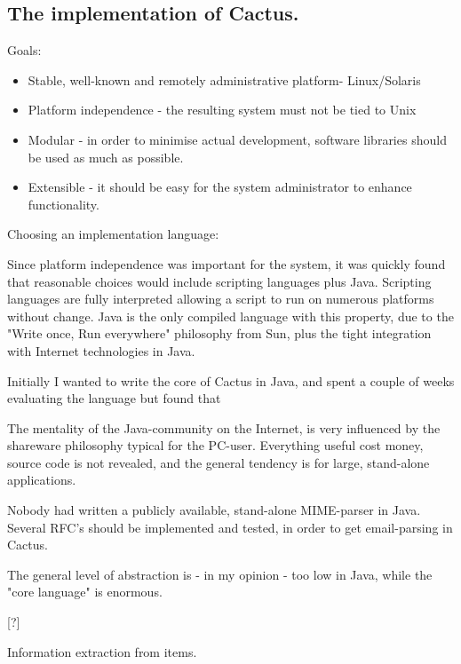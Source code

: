 \subsection{The implementation of Cactus.}



Goals:

\begin{itemize}
\item Stable, well-known and remotely administrative platform-
  Linux/Solaris
\item Platform independence - the resulting system must not be tied to
  Unix
 
\item Modular - in order to minimise actual development, software
  libraries should be used as much as possible.
  
\item Extensible - it should be easy for the system administrator to
  enhance functionality.
\end{itemize}

Choosing an implementation language:

Since platform independence was important for the system, it was
quickly found that reasonable choices would include scripting
languages plus Java.  Scripting languages are fully interpreted
allowing a script to run on numerous platforms without change.  Java
is the only compiled language with this property, due to the "Write
once, Run everywhere" philosophy from Sun, plus the tight integration
with Internet technologies in Java.

Initially I wanted to write the core of Cactus in Java, and spent a
couple of weeks evaluating the language but found that


  The mentality of the Java-community on the Internet, is very influenced by the shareware philosophy typical for the PC-user.   Everything useful cost money, source
code is not revealed, and the general tendency is for large, stand-alone applications.

Nobody had written a publicly available, stand-alone MIME-parser in Java.  Several RFC's should be implemented and tested, in order to get email-parsing in Cactus.

The general level of abstraction is - in my opinion - too low in Java, while the "core language" is enormous.



[?]



Information extraction from items.



